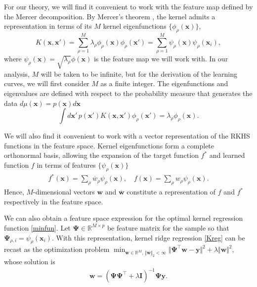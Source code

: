\documentclass{article}
\begin{document}
For our theory, we will find it convenient to work with the feature map defined by the Mercer decomposition. By Mercer's theorem \cite{mercer1909xvi,GPMLRasmussen} 
, the kernel admits a representation in terms of its $M$ kernel eigenfunctions $\{ \phi_\rho(\mathbf{x}) \}$, 
\begin{equation}
    K(\mathbf{x}, \mathbf{x}') = \sum_{\rho = 1}^M \lambda_\rho \phi_{\rho}(\mathbf{x}) \phi_\rho(\mathbf{x}') = \sum_{\rho=1}^M \psi_\rho(\mathbf{x}) \psi_\rho(\mathbf{x}_i),
\end{equation}
%
where $\psi_\rho(\mathbf{x}) = \sqrt{\lambda_\rho} \phi(\mathbf{x})$ is the feature map we will work with. In our analysis, $M$ will be taken to be infinite, but for the derivation of the learning curves, we will first consider $M$ as a finite integer. The eigenfunctions and eigenvalues are defined with respect to the probability measure that generates the data $d\mu(\mathbf{x}) = p(\mathbf{x}) d\mathbf{x}$
\begin{equation}\label{eq:eigenvalue}
    \int  d \mathbf{x}'\,p(\mathbf{x}') K(\mathbf{x}, \mathbf{x}') \phi_\rho(\mathbf{x}')  = \lambda_\rho \phi_\rho(\mathbf{x}).
\end{equation}



We will also find it convenient to work with a vector representation of the RKHS functions in the feature space. Kernel eigenfunctions form a complete orthonormal basis, allowing the expansion of the target function $f^*$ and learned function $f$ in terms of features $\{ \psi_\rho(\mathbf{x}) \}$  
\begin{align}
     f^*(\mathbf{x}) = \sum_\rho \overline{w}_\rho \psi_\rho(\mathbf{x}), \quad
    f(\mathbf{x}) = \sum_\rho w_\rho \psi_\rho(\mathbf{x}).
\end{align}
%
Hence, $M$-dimensional vectors $\mathbf{w}$ and $\mathbf{\overline{w}}$ constitute a representation of $f$ and $f^*$ respectively in the feature space. 

We can also obtain a feature space expression for the optimal kernel regression function \eqref{minfun}. Let $\mathbf{\Psi} \in \mathbb{R}^{M \times p}$ be feature matrix for the sample so that $\mathbf{\Psi}_{\rho, i} = \psi_\rho(\mathbf{x}_i)$. With this representation, kernel ridge regression \eqref{Kreg} can be recast as the optimization problem $\min_{\mathbf{w} \in \mathbb{R}^M, \,\Vert \mathbf{w}\Vert_2 < \infty} \Vert \mathbf{\Psi}^\top \mathbf{w} - \mathbf{y}\Vert^2 + \lambda \Vert \mathbf{w} \Vert^2$,
whose solution is
%
\begin{align}\label{wmin}
    \mathbf{w} = (\mathbf{\Psi} \mathbf{\Psi}^\top + \lambda \mathbf{I})^{-1} \mathbf{\Psi} \mathbf{y}.
\end{align}
\end{document}
